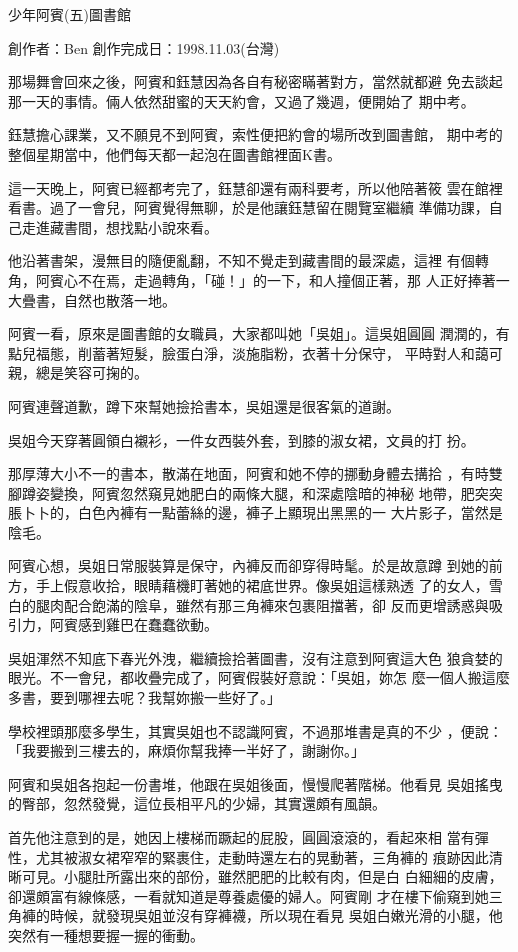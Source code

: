



少年阿賓(五)圖書館

創作者：Ben
創作完成日：1998.11.03(台灣)


那場舞會回來之後，阿賓和鈺慧因為各自有秘密瞞著對方，當然就都避
免去談起那一天的事情。倆人依然甜蜜的天天約會，又過了幾週，便開始了
期中考。

鈺慧擔心課業，又不願見不到阿賓，索性便把約會的場所改到圖書館，
期中考的整個星期當中，他們每天都一起泡在圖書館裡面K書。

這一天晚上，阿賓已經都考完了，鈺慧卻還有兩科要考，所以他陪著筱
雲在館裡看書。過了一會兒，阿賓覺得無聊，於是他讓鈺慧留在閱覽室繼續
準備功課，自己走進藏書間，想找點小說來看。

他沿著書架，漫無目的隨便亂翻，不知不覺走到藏書間的最深處，這裡
有個轉角，阿賓心不在焉，走過轉角，「碰！」的一下，和人撞個正著，那
人正好捧著一大疊書，自然也散落一地。

阿賓一看，原來是圖書館的女職員，大家都叫她「吳姐」。這吳姐圓圓
潤潤的，有點兒福態，削蓄著短髮，臉蛋白淨，淡施脂粉，衣著十分保守，
平時對人和藹可親，總是笑容可掬的。

阿賓連聲道歉，蹲下來幫她撿拾書本，吳姐還是很客氣的道謝。

吳姐今天穿著圓領白襯衫，一件女西裝外套，到膝的淑女裙，文員的打
扮。

那厚薄大小不一的書本，散滿在地面，阿賓和她不停的挪動身體去搆拾
，有時雙腳蹲姿變換，阿賓忽然窺見她肥白的兩條大腿，和深處陰暗的神秘
地帶，肥突突脹卜卜的，白色內褲有一點蕾絲的邊，褲子上顯現出黑黑的一
大片影子，當然是陰毛。

阿賓心想，吳姐日常服裝算是保守，內褲反而卻穿得時髦。於是故意蹲
到她的前方，手上假意收拾，眼睛藉機盯著她的裙底世界。像吳姐這樣熟透
了的女人，雪白的腿肉配合飽滿的陰阜，雖然有那三角褲來包裹阻擋著，卻
反而更增誘惑與吸引力，阿賓感到雞巴在蠢蠢欲動。

吳姐渾然不知底下春光外洩，繼續撿拾著圖書，沒有注意到阿賓這大色
狼貪婪的眼光。不一會兒，都收疊完成了，阿賓假裝好意說：「吳姐，妳怎
麼一個人搬這麼多書，要到哪裡去呢？我幫妳搬一些好了。」

學校裡頭那麼多學生，其實吳姐也不認識阿賓，不過那堆書是真的不少
，便說：「我要搬到三樓去的，麻煩你幫我捧一半好了，謝謝你。」

阿賓和吳姐各抱起一份書堆，他跟在吳姐後面，慢慢爬著階梯。他看見
吳姐搖曳的臀部，忽然發覺，這位長相平凡的少婦，其實還頗有風韻。

首先他注意到的是，她因上樓梯而蹶起的屁股，圓圓滾滾的，看起來相
當有彈性，尤其被淑女裙窄窄的緊裹住，走動時還左右的晃動著，三角褲的
痕跡因此清晰可見。小腿肚所露出來的部份，雖然肥肥的比較有肉，但是白
白細細的皮膚，卻還頗富有線條感，一看就知道是尊養處優的婦人。阿賓剛
才在樓下偷窺到她三角褲的時候，就發現吳姐並沒有穿褲襪，所以現在看見
吳姐白嫩光滑的小腿，他突然有一種想要握一握的衝動。

